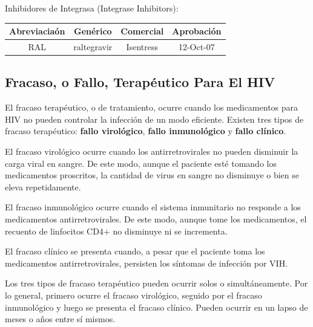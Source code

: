   Inhibidores de Integrasa (Integrase Inhibitors):

  \begin{center}
    \begin{tabular}{|c|c|c|c|}
      \hline Abreviacia\'on & Gen\'erico & Comercial & Aprobaci\'on \\ 
      \hline RAL & raltegravir & Isentress & 12-Oct-07  \\ 
      \hline 
    \end{tabular} 
  \end{center}

  \subsection{Fracaso, o Fallo, Terap\'eutico Para El HIV}\label{fracasoTerapeutico}
  El fracaso terap\'eutico, o de tratamiento, ocurre cuando los medicamentos para HIV no pueden controlar la infecci\'on de un modo eficiente.
  Existen tres tipos de fracaso terap\'eutico: \textbf{fallo virol\'ogico}, \textbf{fallo inmunol\'ogico} y \textbf{fallo cl\'inico}.

  El fracaso virol\'ogico ocurre cuando los antirretrovirales no pueden disminuir la carga viral en sangre. De este modo, aunque el paciente est\'e tomando los 
  medicamentos proscritos, la cantidad de virus en sangre no disminuye o bien se eleva repetidamente.

  El fracaso inmunol\'ogico ocurre cuando el sistema inmunitario no responde a los medicamentos antirretrovirales. De este modo, aunque tome los medicamentos, el recuento de linfocitos CD4+ no disminuye ni se incrementa.

  El fracaso cl\'inico se presenta cuando, a pesar que el paciente toma los medicamentos antirretrovirales, persisten los s\'intomas de infecci\'on por VIH.

  Los tres tipos de fracaso terap\'eutico pueden ocurrir solos o simult\'aneamente. Por lo general, primero ocurre el fracaso virol\'ogico, seguido por el
  fracaso inmunol\'ogico y luego se presenta el fracaso cl\'inico. Pueden ocurrir en un lapso de meses o a\~nos entre s\'i mismos.

